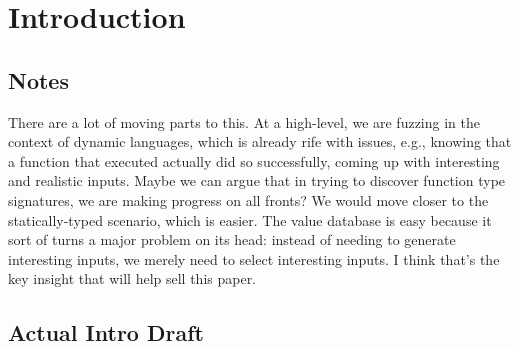 \section{Introduction}

\subsection{Notes}

There are a lot of moving parts to this.
At a high-level, we are fuzzing in the context of dynamic languages, which is already rife with issues, e.g., knowing that a function that executed actually did so successfully, coming up with interesting and realistic inputs.
Maybe we can argue that in trying to discover function type signatures, we are making progress on all fronts?
We would move closer to the statically-typed scenario, which is easier.
The value database is easy because it sort of turns a major problem on its head:
instead of needing to generate interesting inputs, we merely need to select interesting inputs.
I think that's the key insight that will help sell this paper. 

\subsection{Actual Intro Draft}

